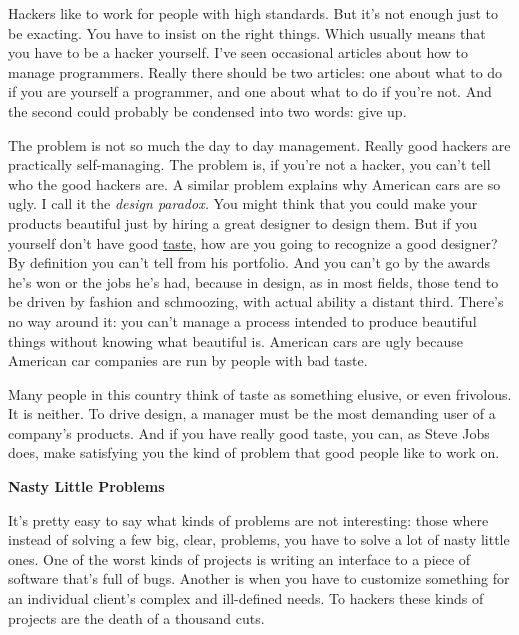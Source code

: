 Hackers like to work for
                    people with high standards. But it's not enough just to be
                    exacting. You have to insist on the right things. Which
                    usually means that you have to be a hacker yourself. I've
                    seen occasional articles about how to manage programmers.
                    Really there should be two articles: one about what to do if
                    you are yourself a programmer, and one about what to do if
                    you're not. And the second could probably be condensed into
                    two words: give up.

The problem is not so much
                    the day to day management. Really good hackers are
                    practically self-managing. The problem is, if you're not a
                    hacker, you can't tell who the good hackers are. A similar
                    problem explains why American cars are so ugly. I call it
                    the \emph{design paradox.} You might think that you could
                    make your products beautiful just by hiring a great designer
                    to design them. But if you yourself don't have good
                    \href{http://www.paulgraham.com/taste.html}{taste}, how are you going to
                    recognize a good designer? By definition you can't tell from
                    his portfolio. And you can't go by the awards he's won or
                    the jobs he's had, because in design, as in most fields,
                    those tend to be driven by fashion and schmoozing, with
                    actual ability a distant third. There's no way around it:
                    you can't manage a process intended to produce beautiful
                    things without knowing what beautiful is. American cars are
                    ugly because American car companies are run by people with
                    bad taste.

Many people in this country think of
                    taste as something elusive, or even frivolous. It is
                    neither. To drive design, a manager must be the most
                    demanding user of a company's products. And if you have
                    really good taste, you can, as Steve Jobs does, make
                    satisfying you the kind of problem that good people like to
                    work on.

\textbf{Nasty Little Problems}

It's pretty easy to say what kinds of problems
                    are not interesting: those where instead of solving a few
                    big, clear, problems, you have to solve a lot of nasty
                    little ones. One of the worst kinds of projects is writing
                    an interface to a piece of software that's full of bugs.
                    Another is when you have to customize something for an
                    individual client's complex and ill-defined needs. To
                    hackers these kinds of projects are the death of a thousand
                    cuts.

